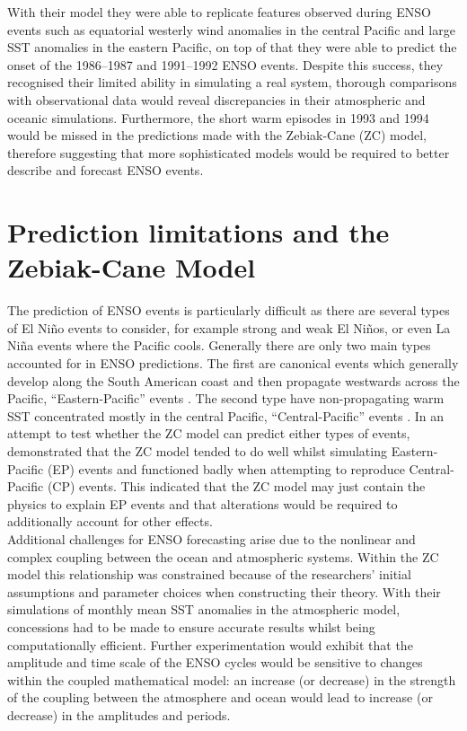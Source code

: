 \documentclass[12pt, onecolumn]{revtex4}    %
\begin{document}
With their model they were able to replicate features observed during ENSO events such as equatorial westerly wind anomalies in the central Pacific and large SST anomalies in the eastern Pacific, on top of that they were able to predict the onset of the 1986--1987 and 1991--1992 ENSO events. Despite this success, they recognised their limited ability in simulating a real system, thorough comparisons with observational data would reveal discrepancies in their atmospheric and oceanic simulations. Furthermore, the short warm episodes in 1993 and 1994 would be missed in the predictions made with the Zebiak-Cane (ZC) model, therefore suggesting that more sophisticated models would be required to better describe and forecast ENSO events.

\section{Prediction limitations and the Zebiak-Cane Model}
\noindent
The prediction of ENSO events is particularly difficult as there are several types of El Ni\~{n}o events to consider, for example strong and weak El Ni\~{n}os, or even La Ni\~{n}a events where the Pacific cools. Generally there are only two main types accounted for in ENSO predictions. The first are canonical events which generally develop along the South American coast and then propagate westwards across the Pacific, ``Eastern-Pacific'' events \citep{rasmusson1982variations}. The second type have non-propagating warm SST concentrated mostly in the central Pacific, ``Central-Pacific'' events \citep{ashok2007nino}. In an attempt to test whether the ZC model can predict either types of events, \cite{duan2013behaviors} demonstrated that the ZC model tended to do well whilst simulating Eastern-Pacific (EP) events and functioned badly when attempting to reproduce Central-Pacific (CP) events. This indicated that the ZC model may just contain the physics to explain EP events and that alterations would be required to additionally account for other effects. \\

Additional challenges for ENSO forecasting arise due to the nonlinear and complex coupling between the ocean and atmospheric systems. Within the ZC model this relationship was constrained because of the researchers' initial assumptions and parameter choices when constructing their theory. With their simulations of monthly mean SST anomalies in the atmospheric model, concessions had to be made to ensure accurate results whilst being computationally efficient. Further experimentation would exhibit that the amplitude and time scale of the ENSO cycles would be sensitive to changes within the coupled mathematical model: an increase (or decrease) in the strength of the coupling between the atmosphere and ocean would lead to increase (or decrease) in the amplitudes and periods. \\
\end{document}
